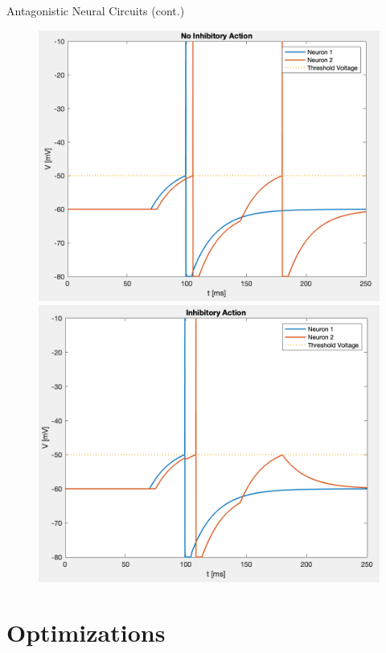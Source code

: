 \documentclass[leqno,presentation,unknownkeysallowed]{beamer}
\begin{document}
\begin{frame}{Antagonistic Neural Circuits (cont.)}
\begin{figure}
\center
\includegraphics[scale=0.285]{no_inhib.png}\hspace{1em}\includegraphics[scale=0.285]{inhib.png}
\end{figure}
\end{frame}


\section{Optimizations}
\end{document}
